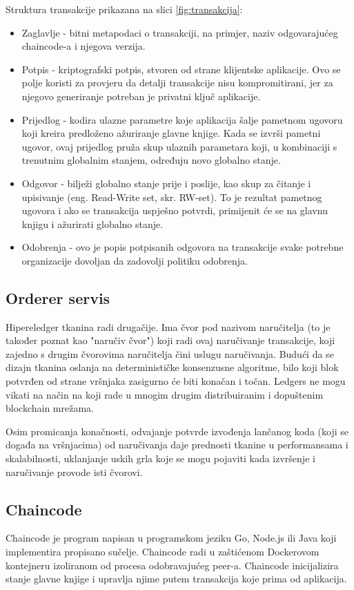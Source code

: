 \documentclass[times, utf8, diplomski]{fer}
\begin{document}
Struktura transakcije prikazana na slici \ref{fig:transakcija}:
\begin{itemize}
\item Zaglavlje - bitni metapodaci o transakciji, na primjer, naziv odgovarajućeg chaincode-a i njegova verzija.
\item Potpis - kriptografski potpis,  stvoren od strane klijentske aplikacije. Ovo se polje koristi za provjeru da detalji transakcije nisu kompromitirani, jer za njegovo generiranje potreban je privatni ključ aplikacije.
\item Prijedlog - kodira ulazne parametre koje aplikacija šalje pametnom ugovoru koji kreira predloženo ažuriranje glavne knjige. Kada se izvrši pametni ugovor, ovaj prijedlog pruža skup ulaznih parametara koji, u kombinaciji s trenutnim globalnim stanjem, određuju novo globalno stanje.
\item Odgovor - bilježi globalno stanje prije i poslije, kao skup za čitanje i upisivanje (eng. Read-Write set, skr. RW-set). To je rezultat pametnog ugovora i ako se transakcija uspješno potvrdi, primijenit će se na glavnu knjigu i ažurirati globalno stanje.
\item Odobrenja - ovo je popis potpisanih odgovora na transakcije svake potrebne organizacije dovoljan da zadovolji politiku odobrenja. 
\end{itemize}
\subsection{Orderer servis}

Hipereledger tkanina radi drugačije. Ima čvor pod nazivom naručitelja (to je također poznat kao "naručiv čvor") koji radi ovaj naručivanje transakcije, koji zajedno s drugim čvorovima naručitelja čini uslugu naručivanja. Budući da se dizajn tkanina oslanja na determinističke konsenzusne algoritme, bilo koji blok potvrđen od strane vršnjaka zasigurno će biti konačan i točan. Ledgers ne mogu vikati na način na koji rade u mnogim drugim distribuiranim i dopuštenim blockchain mrežama.

Osim promicanja konačnosti, odvajanje potvrde izvođenja lančanog koda (koji se događa na vršnjacima) od naručivanja daje prednosti tkanine u performansama i skalabilnosti, uklanjanje uskih grla koje se mogu pojaviti kada izvršenje i naručivanje provode isti čvorovi.


\subsection{Chaincode}
Chaincode je program napisan u programskom jeziku Go,  Node.js ili Java koji implementira propisano sučelje.  Chaincode radi u zaštićenom Dockerovom kontejneru izoliranom od procesa odobravajućeg peer-a.  Chaincode inicijalizira stanje glavne knjige i upravlja njime putem transakcija koje prima od aplikacija.
\end{document}
